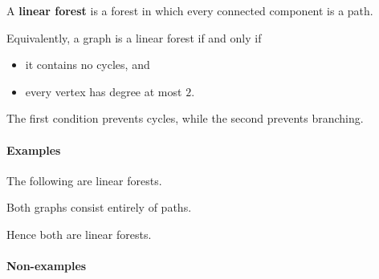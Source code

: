 \documentclass[11pt]{article}
\theoremstyle{plain}
\theoremstyle{definition}
\theoremstyle{remark}
\begin{document}
A \textbf{linear forest} is a forest in which every connected component is a path.

Equivalently, a graph is a linear forest if and only if

\begin{itemize}
    \item it contains no cycles, and
    \item every vertex has degree at most $2$.
\end{itemize}

The first condition prevents cycles, while the second prevents branching.

\paragraph{Examples}

The following are linear forests.

\begin{center}
\end{center}

Both graphs consist entirely of paths.

Hence both are linear forests.

\paragraph{Non-examples}
\end{document}
